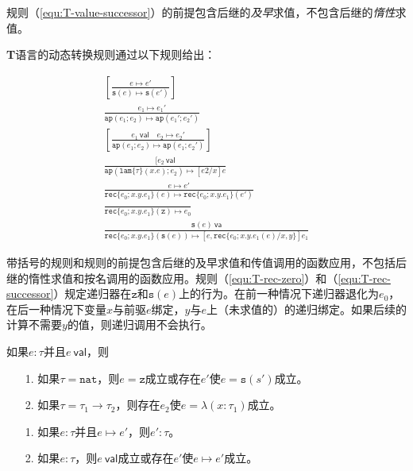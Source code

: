 规则（\ref{equ:T-value-successor}）的前提包含后继的\textit{及早}求值，不包含后继的\textit{惰性}求值。

\textbf{T}语言的动态转换规则通过以下规则给出：

\begin{subequations}
\begin{gather}
\left[\frac{e\longmapsto e'}{\mathtt{s}(e)\longmapsto\mathtt{s}(e')}\right]\\
\frac{e_1\longmapsto e_1 '}{\mathtt{ap}(e_1;e_2)\longmapsto\mathtt{ap}(e_1 ';e_2 ')}\\
\left[\frac{e_1\ \mathsf{val}\quad e_2\longmapsto e_2'}{\mathtt{ap}(e_1;e_2)\longmapsto\mathtt{ap}(e_1;e_2')}\right]\\
\frac{[e_2\ \mathsf{val}}{\mathtt{ap}(\mathtt{lam}\{\tau\}(x.e);e_2)\longmapsto[e2/x]e}\\
\frac{e\longmapsto e'}{\mathtt{rec}\{e_0;x.y.e_1\}(e)\longmapsto\mathtt{rec}\{e_0;x.y.e_1\}(e')}\\
\label{equ:T-rec-zero}\frac{}{\mathtt{rec}\{e_0;x.y.e_1\}(\mathtt{z})\longmapsto e_0}\\
\label{equ:T-rec-successor}\frac{\mathtt{s}(e)\ \mathsf{va}}{\mathtt{rec}\{e_0;x.y.e_1\}(\mathtt{s}(e))\longmapsto[e,\mathtt{rec}\{e_0;x.y.e_1(e)/x,y\}]e_1}
\end{gather}
\end{subequations}

带括号的规则和规则的前提包含后继的及早求值和传值调用的函数应用，不包括后继的惰性求值和按名调用的函数应用。规则（\ref{equ:T-rec-zero}）和（\ref{equ:T-rec-successor}）规定递归器在$\mathtt{z}$和$\mathtt{s}(e)$上的行为。在前一种情况下递归器退化为$e_0$，在后一种情况下变量$x$与前驱$e$绑定，$y$与$e$上（未求值的）的递归绑定。如果后续的计算不需要$y$的值，则递归调用不会执行。

\begin{lemma}[范式]\label{lemma:T-canonical-form}
如果$e:\tau$并且$e\ \mathsf{val}$，则
\begin{itemize}
\item[1.] 如果$\tau=\mathtt{nat}$，则$e=\mathtt{z}$成立或存在$e'$使$e=\mathtt{s}(s')$成立。
\item[2.] 如果$\tau=\tau_1\to\tau_2$，则存在$e_2$使$e=\lambda(x:\tau_1)$成立。
\end{itemize}
\end{lemma}

\begin{theorem}[安全性]\label{theorem:safety}
\begin{itemize}
\item[1.] 如果$e:\tau$并且$e\longmapsto e'$，则$e':\tau$。
\item[2.] 如果$e:\tau$，则$e\ \mathsf{val}$成立或存在$e'$使$e\longmapsto e'$成立。
\end{itemize}
\end{theorem}

